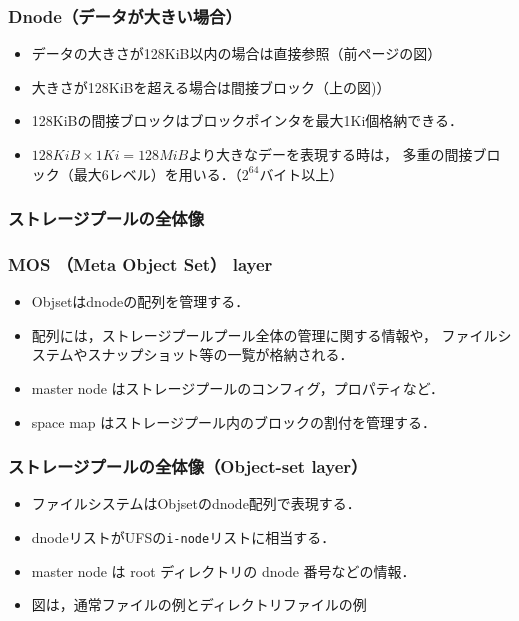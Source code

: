 \documentclass[unicode,handout]{beamer}                   %
\begin{document}
\begin{frame}[fragile]
  \frametitle{Dnode（データが大きい場合）}
  \centerline{}
  \vfill
  \begin{itemize}
  \item データの大きさが128KiB以内の場合は直接参照（前ページの図）
  \item 大きさが128KiBを超える場合は間接ブロック（上の図)）
  \item 128KiBの間接ブロックはブロックポインタを最大1Ki個格納できる．
  \item $128KiB \times 1Ki = 128MiB$より大きなデーを表現する時は，
    多重の間接ブロック（最大6レベル）を用いる．（$2^{64}$バイト以上）
  \end{itemize}
  \vfill
\end{frame}

\begin{frame}[fragile]
  \frametitle{ストレージプールの全体像}
  \vfill
\end{frame}

\begin{frame}[fragile]
  \frametitle{MOS （Meta Object Set） layer}
  \begin{itemize}
  \item Objsetはdnodeの配列を管理する．
  \item 配列には，ストレージプールプール全体の管理に関する情報や，
    ファイルシステムやスナップショット等の一覧が格納される．
  \item master node はストレージプールのコンフィグ，プロパティなど．
  \item space map はストレージプール内のブロックの割付を管理する．
  \end{itemize}
  \vfill
\end{frame}

\begin{frame}[fragile]
  \frametitle{ストレージプールの全体像（Object-set layer）}
  \begin{itemize}
  \item ファイルシステムはObjsetのdnode配列で表現する．
  \item dnodeリストがUFSの\texttt{i-node}リストに相当する．
  \item master node は root ディレクトリの dnode 番号などの情報．
  \item 図は，通常ファイルの例とディレクトリファイルの例
  \end{itemize}
  \vfill
\end{frame}
\end{document}
